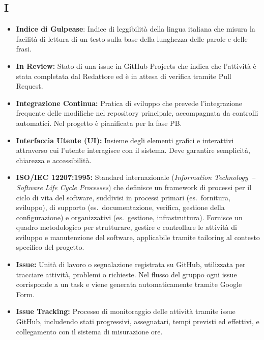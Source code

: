 \subsection*{I}
\begin{itemize}[leftmargin=*]
      \item \textbf{Indice di Gulpease}: Indice di leggibilità della lingua italiana che
      misura la facilità di lettura di un testo sulla base della lunghezza delle parole
      e delle frasi.
      \item \textbf{In Review:} Stato di una issue in GitHub Projects che indica che l'attività è stata completata dal Redattore ed è in attesa di verifica tramite Pull Request.
      \item \textbf{Integrazione Continua:} Pratica di sviluppo che prevede l'integrazione frequente delle modifiche nel repository principale, accompagnata da controlli automatici. Nel progetto è pianificata per la fase PB.
      \item \textbf{Interfaccia Utente (UI):} Insieme degli elementi grafici e interattivi attraverso cui l'utente interagisce con il sistema. Deve garantire semplicità, chiarezza e accessibilità.
      \item \textbf{ISO/IEC 12207:1995:} Standard internazionale
            (\textit{Information Technology~-- Software Life Cycle Processes})
            che definisce un framework di processi per il ciclo di vita del software,
            suddivisi in processi primari (es.\ fornitura, sviluppo), di supporto
            (es.\ documentazione, verifica, gestione della configurazione) e
            organizzativi (es.\ gestione, infrastruttura). Fornisce un quadro
            metodologico per strutturare, gestire e controllare le attività di
            sviluppo e manutenzione del software, applicabile tramite tailoring al
            contesto specifico del progetto.
      \item \textbf{Issue:} Unità di lavoro o segnalazione registrata su GitHub,
            utilizzata per tracciare attività, problemi o richieste. Nel flusso del
            gruppo ogni issue corrisponde a un task e viene generata automaticamente
            tramite Google Form.
      \item \textbf{Issue Tracking:} Processo di monitoraggio delle attività tramite issue GitHub, includendo stati progressivi, assegnatari, tempi previsti ed effettivi, e collegamento con il sistema di misurazione ore.
\end{itemize}
 
{}
